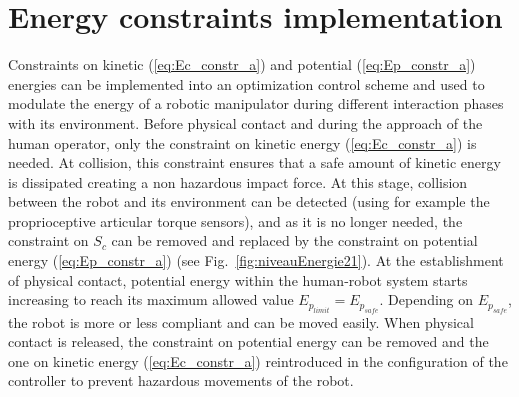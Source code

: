\section{Energy constraints implementation}
\label{subsec:Econstr_acti_deacti}
Constraints on kinetic (\ref{eq:Ec_constr_a}) and potential (\ref{eq:Ep_constr_a}) energies can be implemented into an optimization control scheme and used to modulate the energy of a robotic manipulator during different interaction phases with its environment. Before physical contact and during the approach of the human operator, only the constraint on kinetic energy (\ref{eq:Ec_constr_a}) is needed. At collision, this constraint ensures that a safe amount of kinetic energy is dissipated creating a non hazardous impact force. At this stage, collision between the robot and its environment can be detected (using for example the proprioceptive articular torque sensors), and as it is no longer needed, the constraint on $S_c$ can be removed and replaced by the constraint on potential energy (\ref{eq:Ep_constr_a}) (see Fig.~\ref{fig:niveauEnergie21}). At the establishment of physical contact, potential energy within the human-robot system starts increasing to reach its maximum allowed value $E_{p_{limit}} = E_{p_{safe}}$. Depending on $E_{p_{safe}}$, the robot is more or less compliant and can be moved easily. When physical contact is released, the constraint on potential energy can be removed and the one on kinetic energy (\ref{eq:Ec_constr_a}) reintroduced in the configuration of the controller to prevent hazardous movements of the robot. 
